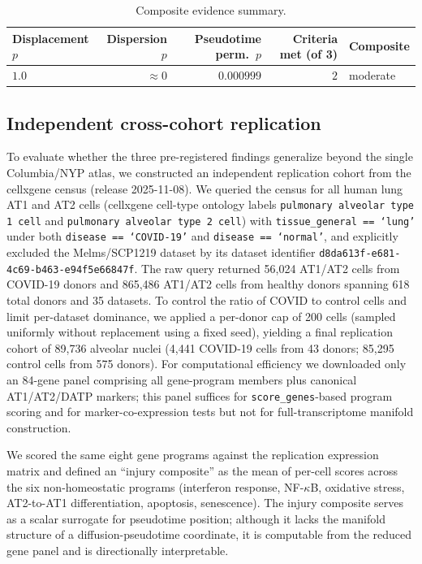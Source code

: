\documentclass[11pt]{article}
\begin{document}
\begin{table}[H]
\centering
\begin{tabular}{lrrrl}
\toprule
Displacement $p$ & Dispersion $p$ & Pseudotime perm.\ $p$ & Criteria met (of 3) & Composite \\
\midrule
$1.0$ & $\approx 0$ & $0.000999$ & $2$ & moderate \\
\bottomrule
\end{tabular}
\caption{Composite evidence summary.}
\label{tab:tab3}
\end{table}

\subsection{Independent cross-cohort replication}\label{sec:replication}

To evaluate whether the three pre-registered findings generalize beyond the single Columbia/NYP atlas, we constructed an independent replication cohort from the cellxgene census (release 2025-11-08). We queried the census for all human lung AT1 and AT2 cells (cellxgene cell-type ontology labels \texttt{pulmonary alveolar type 1 cell} and \texttt{pulmonary alveolar type 2 cell}) with \texttt{tissue\_general == `lung'} under both \texttt{disease == `COVID-19'} and \texttt{disease == `normal'}, and explicitly excluded the Melms/SCP1219 dataset by its dataset identifier \texttt{d8da613f-e681-4c69-b463-e94f5e66847f}. The raw query returned 56{,}024 AT1/AT2 cells from COVID-19 donors and 865{,}486 AT1/AT2 cells from healthy donors spanning 618 total donors and 35 datasets. To control the ratio of COVID to control cells and limit per-dataset dominance, we applied a per-donor cap of 200 cells (sampled uniformly without replacement using a fixed seed), yielding a final replication cohort of 89{,}736 alveolar nuclei (4{,}441 COVID-19 cells from 43 donors; 85{,}295 control cells from 575 donors). For computational efficiency we downloaded only an 84-gene panel comprising all gene-program members plus canonical AT1/AT2/DATP markers; this panel suffices for \texttt{score\_genes}-based program scoring and for marker-co-expression tests but not for full-transcriptome manifold construction.

We scored the same eight gene programs against the replication expression matrix and defined an ``injury composite'' as the mean of per-cell scores across the six non-homeostatic programs (interferon response, NF-$\kappa$B, oxidative stress, AT2-to-AT1 differentiation, apoptosis, senescence). The injury composite serves as a scalar surrogate for pseudotime position; although it lacks the manifold structure of a diffusion-pseudotime coordinate, it is computable from the reduced gene panel and is directionally interpretable.
\end{document}
